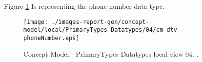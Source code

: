 Figure \ref{fig:lu.uni.lassy.excalibur.group09.spec-CM-view-local-PrimaryTypes-Datatypes-04} Is representing the phone number data type.



\begin{figure}[htbp] 
\label{fig:lu.uni.lassy.excalibur.group09.spec-CM}
\begin{center}
\texttt{[image: ./images-report-gen/concept-model/local/PrimaryTypes-Datatypes/04/cm-dtv-phoneNumber.eps]}
\end{center}
\caption[Concept Model - PrimaryTypes-Datatypes local view 04 - ]{Concept Model - PrimaryTypes-Datatypes local view 04. .}
\label{fig:lu.uni.lassy.excalibur.group09.spec-CM-view-local-PrimaryTypes-Datatypes-04}
\end{figure}
\vspace{0.5cm} 
